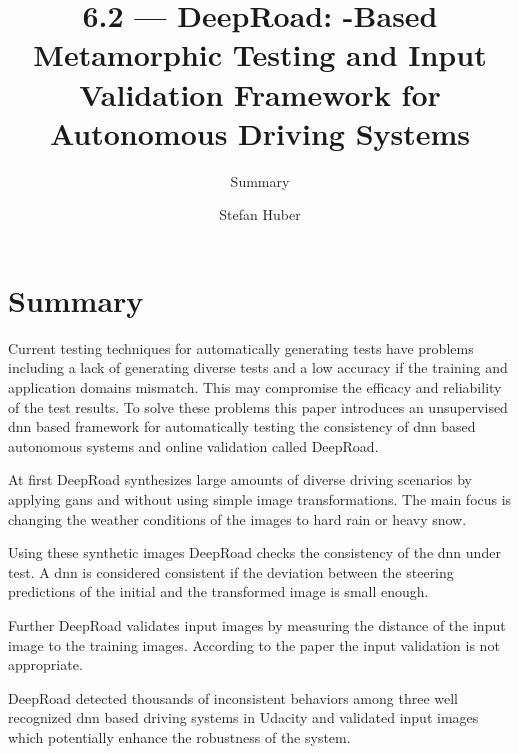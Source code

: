 \documentclass[oneside, notitlepage, twocolumn]{scrartcl}
\title{\LARGE 6.2 --- DeepRoad: \glstext{gan}-Based Metamorphic Testing and Input Validation Framework for Autonomous Driving Systems}
\subtitle{Summary}
\author{Stefan Huber}
\begin{document}
\maketitle

\section{Summary}
Current testing techniques for automatically generating tests have problems including a lack of generating diverse tests and a low accuracy if the training and application domains mismatch.
This may compromise the efficacy and reliability of the test results.
To solve these problems this paper introduces an unsupervised \gls{dnn} based framework for automatically testing the consistency of \gls{dnn} based autonomous systems and online validation called DeepRoad.\par
At first DeepRoad synthesizes large amounts of diverse driving scenarios by applying \glspl{gan} and without using simple image transformations.
The main focus is changing the weather conditions of the images to hard rain or heavy snow.\par
Using these synthetic images DeepRoad checks the consistency of the \gls{dnn} under test.
A \gls{dnn} is considered consistent if the deviation between the steering predictions of the initial and the transformed image is small enough.\par
Further DeepRoad validates input images by measuring the distance of the input image to the training images.
According to the paper the input validation is not appropriate.\par
DeepRoad detected thousands of inconsistent behaviors among three well recognized \gls{dnn} based driving systems in Udacity and validated input images which potentially enhance the robustness of the system.
\end{document}
